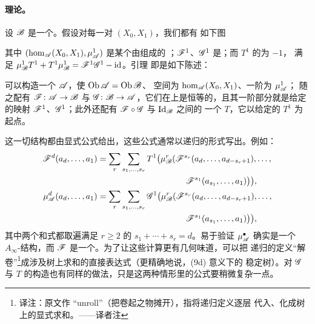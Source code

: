 \paragraph{\trHomology{}\trPerturbation{}理论。}\label{sub:homological-perturbation}
设 $\mathscr{B}$ 是一个\trNonunital{}\trACategory。假设对每一对\trObject{} $(X_0,X_1)$，我们都有
如下图
其中 $(\hom_{\mathscr{A}}(X_0,X_1),\mu^1_{\mathscr{A}})$ 是某个由\trVectorSpace{}组成的%
\trChainComplex；$\mathscr{F}^1$、$\mathscr{G}^1$ 是\trChainMap；而 $T^1$ 的\trDegree{}为 $-1$，
满足 $\mu^1_{\mathscr{B}}T^1+T^1\mu^1_{\mathscr{B}}=\mathscr{F}^1\mathscr{G}^1-\mathrm{id}$。\trPerturbation{}引理
即是如下陈述：

\begin{proposition}\label{thm:perturbation-lemma}
可以构造一个\trNonunital{}\trACategory{} $\mathscr{A}$，使 $\operatorname{Ob}\mathscr{A}=\operatorname{Ob}\mathscr{B}$、%
\trMorphism{}空间为 $\hom_{\mathscr{A}}(X_0,X_1)$、一阶\trStructureMap{}为
$\mu^1_{\mathscr{A}}$；
随之配有\trNonunital{}\trAFunctor{} $\mathscr{F}\colon\mathscr{A}\to\mathscr{B}$ 与
$\mathscr{G}\colon\mathscr{B}\to\mathscr{A}$，它们在\trObject{}上是恒等的，且其一阶部分就是给定的映射
$\mathscr{F}^1$、$\mathscr{G}^1$；此外还配有 $\mathscr{F}\circ\mathscr{G}$ 与 $\mathrm{Id}_{\mathscr{B}}$ 之间的
一个\trHomotopy{} $T$，它以给定的 $T^1$ 为起点。\noqed
\end{proposition}

这一切结构都由显式公式给出，这些公式通常以递归的形式写出。例如：
\begin{equation}\label{eq:perturbation-recursive-formulae}
\begin{aligned}
\scr{F}^d(a_d,\ldots,a_1)&=\sum_r\sum_{s_1,\ldots,s_r}
T^1\bigl(\mu^r_{\scr{B}}(\scr{F}^{s_r}(a_d,\ldots,a_{d-s_r+1}),\ldots,\\
&\hspace{10.5em}\scr{F}^{s_1}(a_{s_1},\ldots,a_1)\bigr)\bigr),\\
\mu^d_{\scr{A}}(a_d,\ldots,a_1)&=\sum_r\sum_{s_1,\ldots,s_r}
\scr{G}^1\bigl(\mu^r_{\scr{B}}(\scr{F}^{s_r}(a_d,\ldots,a_{d-s_r+1}),\ldots,\\
&\hspace{10.5em}\scr{F}^{s_1}(a_{s_1},\ldots,a_1)\bigr)\bigr),
\end{aligned}
\end{equation}
其中两个和式都取遍满足 $r\ge 2$ 的\trPartition{} $s_1+\cdots+s_r=d$。易于验证
$\mu^{\bullet}_{\mathscr{A}}$
确实是一个 $A_\infty$-结构，而 $\mathscr{F}$ 是一个\trAFunctor。为了让这些计算更有几何味道，可以把
递归的定义“解卷”\footnote{译注：原文作 “unroll”（把卷起之物摊开），指将递归定义逐层
代入、化成树上的显式求和。——译者注}成涉及树上求和的直接表达式（更精确地说，(9d) 意义下的
稳定树）。对 $\mathscr{G}$ 与 $T$ 的构造也有同样的做法，只是这两种情形里的公式要稍微复杂一点。

